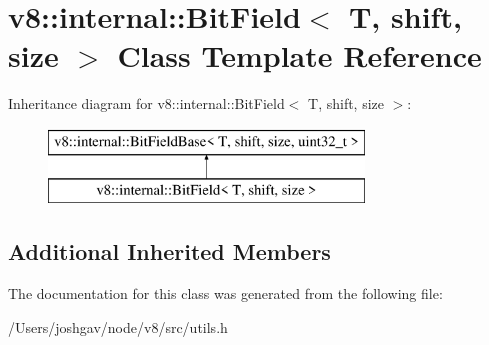 \hypertarget{classv8_1_1internal_1_1_bit_field}{}\section{v8\+:\+:internal\+:\+:Bit\+Field$<$ T, shift, size $>$ Class Template Reference}
\label{classv8_1_1internal_1_1_bit_field}
Inheritance diagram for v8\+:\+:internal\+:\+:Bit\+Field$<$ T, shift, size $>$\+:\begin{figure}[H]
\begin{center}
\leavevmode
\includegraphics[height=2.000000cm]{classv8_1_1internal_1_1_bit_field}
\end{center}
\end{figure}
\subsection*{Additional Inherited Members}


The documentation for this class was generated from the following file\+:\begin{DoxyCompactItemize}
\item 
/\+Users/joshgav/node/v8/src/utils.\+h\end{DoxyCompactItemize}
